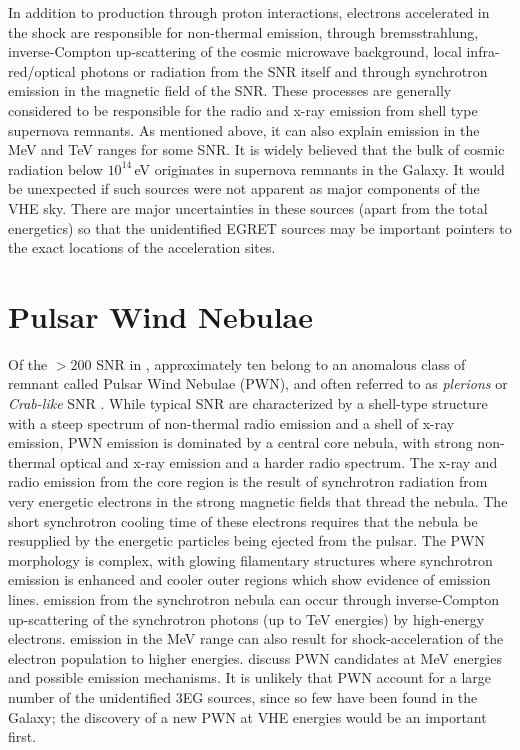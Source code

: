 In addition to \Gray production through proton interactions, electrons
accelerated in the shock are responsible for non-thermal emission,
through bremsstrahlung, inverse-Compton up-scattering of the cosmic
microwave background, local infra-red/optical photons or radiation
from the SNR itself and through synchrotron emission in the magnetic
field of the SNR. These processes are generally considered to be
responsible for the radio and x-ray emission from shell type supernova
remnants.  As mentioned above, it can also explain \Gray emission in
the MeV and TeV ranges for some SNR. It is widely believed that the
bulk of cosmic radiation below $10^{14}$\,eV originates in supernova
remnants in the Galaxy. It would be unexpected if such sources were
not apparent as major components of the VHE \Gray sky. There are major
uncertainties in these sources (apart from the total energetics) so
that the unidentified EGRET sources may be important pointers to the
exact locations of the acceleration sites.

\section{Pulsar Wind Nebulae}
\label{SEC::SOURCES::PWN}

Of the $>200$ SNR in \citet{REF::GREEN::WEB2001}, approximately ten
belong to an anomalous class of remnant called Pulsar Wind Nebulae
(PWN), and often referred to as \textit{plerions} or
\textit{Crab-like} SNR \citep[see][]{REF::CHEVALIER::APJ2000}. 
While typical SNR are characterized by a shell-type structure with a
steep spectrum of non-thermal radio emission and a shell of x-ray
emission, PWN emission is dominated by a central core nebula, with
strong non-thermal optical and x-ray emission and a harder radio
spectrum. The x-ray and radio emission from the core region is the
result of synchrotron radiation from very energetic electrons in the
strong magnetic fields that thread the nebula. The short synchrotron
cooling time of these electrons requires that the nebula be resupplied
by the energetic particles being ejected from the pulsar. The PWN
morphology is complex, with glowing filamentary structures where
synchrotron emission is enhanced and cooler outer regions which show
evidence of emission lines. \Gray emission from the synchrotron nebula
can occur through inverse-Compton up-scattering of the synchrotron
photons (up to TeV energies) by high-energy electrons. \Gray emission
in the MeV range can also result for shock-acceleration of the
electron population to higher energies. \citet{REF::ROBERTS::NSSR2002}
discuss PWN candidates at MeV energies and possible emission
mechanisms.  It is unlikely that PWN account for a large number of the
unidentified 3EG sources, since so few have been found in the Galaxy;
the discovery of a new PWN at VHE energies would be an important
first.

